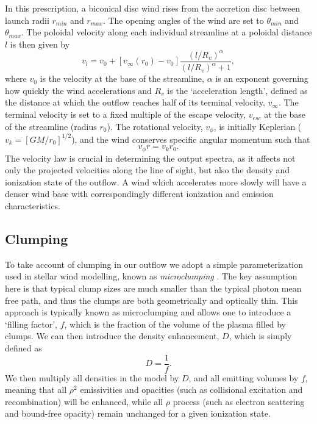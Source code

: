 \documentclass[useAMS,usenatbib]{mn2e_x}
\begin{document}
In this prescription, a biconical disc wind rises from the accretion 
disc between launch radii $r_{min}$ and $r_{max}$.
The opening angles of the wind are set to $\theta_{min}$ and $\theta_{max}$.
The poloidal velocity along each individual streamline at a poloidal distance $l$ 
is then given by
\begin{equation}
v_l=v_0+\left[v_{\infty}(r_0)-v_0\right]\frac{\left(l/R_v\right)^{\alpha}}{\left(l/R_v\right)^{\alpha}+1},
\label{v_law}
\end{equation}
where $v_0$ is the velocity at the base of the streamline, $\alpha$ is
an exponent governing how quickly the wind accelerations and 
$R_v$ is the `acceleration length', defined as the distance at which
the outflow reaches half of its terminal velocity, $v_{\infty}$.
The terminal velocity is set to a fixed multiple of the escape
velocity, $v_{esc}$ at the base of the streamline (radius $r_0$).
The rotational velocity, $v_{\phi}$, is initially Keplerian ($v_k = [GM/r_0]^{1/2}$),
and the wind conserves specific angular momentum such that 
\begin{equation}
v_{\phi} r = v_k r_0.
\label{v_law}
\end{equation}
The velocity law is crucial in determining the output spectra,
as it affects not only the projected velocities along the line of sight,
but also the density and ionization state of the outflow.
A wind which accelerates more slowly will have a denser wind base
with correspondingly different ionization and emission characteristics.



\subsection{Clumping}

To take account of clumping in our outflow we adopt a simple parameterization
used in stellar wind modelling, known as {\em microclumping} \citep{hamann1998}. 
The key assumption here is that typical clump sizes
are much smaller than the typical photon mean free path, and thus the clumps are 
both geometrically and optically thin. This approach is typically 
known as microclumping and allows one to introduce a `filling factor', $f$, which is the 
fraction of the volume of the plasma filled by clumps. We can then introduce the 
density enhancement, $D$, which is simply defined as 
\begin{equation}
D = \frac{1}{f}.
\end{equation}
We then multiply all densities in the model by $D$, and all emitting volumes
by $f$, meaning that all $\rho^2$ emissivities and opacities
(such as collisional excitation and recombination) will be enhanced, 
while all $\rho$ process (such as electron scattering and bound-free opacity)
remain unchanged for a given ionization state. 
\end{document}
